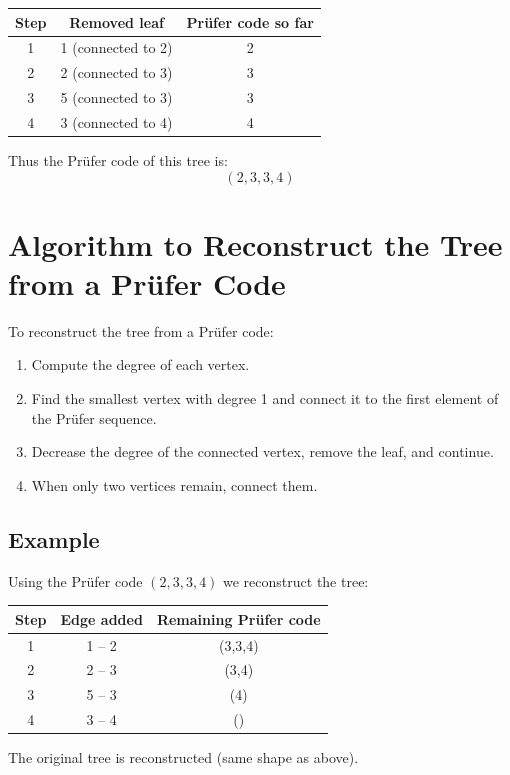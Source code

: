 \documentclass{article}
\begin{document}
	\begin{center}
		\begin{tabular}{|c|c|c|}
			\hline
			Step & Removed leaf & Prüfer code so far \\
			\hline
			1 & 1 (connected to 2) & 2 \\
			2 & 2 (connected to 3) & 3 \\
			3 & 5 (connected to 3) & 3 \\
			4 & 3 (connected to 4) & 4 \\
			\hline
		\end{tabular}
	\end{center}
	
	Thus the Prüfer code of this tree is:
	\[
	(2,3,3,4)
	\]
	
	\section{Algorithm to Reconstruct the Tree from a Prüfer Code}
	To reconstruct the tree from a Prüfer code:
	\begin{enumerate}
		\item Compute the degree of each vertex.
		\item Find the smallest vertex with degree 1 and connect it to the first element of the Prüfer sequence.
		\item Decrease the degree of the connected vertex, remove the leaf, and continue.
		\item When only two vertices remain, connect them.
	\end{enumerate}
	
	\subsection{Example}
	Using the Prüfer code $(2,3,3,4)$ we reconstruct the tree:
	
	\begin{center}
		\begin{tabular}{|c|c|c|}
			\hline
			Step & Edge added & Remaining Prüfer code \\
			\hline
			1 & 1 – 2 & (3,3,4) \\
			2 & 2 – 3 & (3,4) \\
			3 & 5 – 3 & (4) \\
			4 & 3 – 4 & () \\
			\hline
		\end{tabular}
	\end{center}
	
	The original tree is reconstructed (same shape as above).
	
\end{document}
